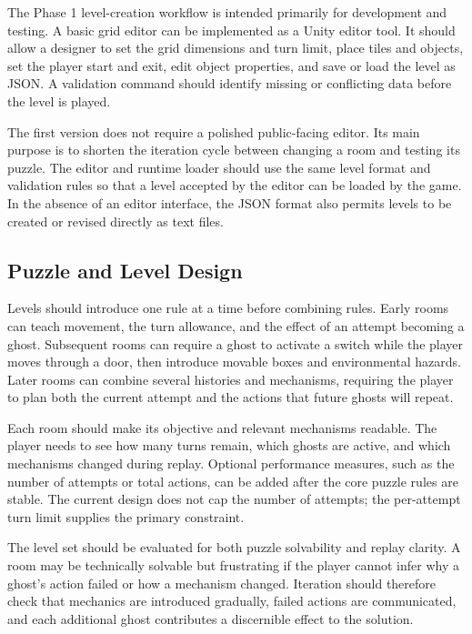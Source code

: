 The Phase 1 level-creation workflow is intended primarily for development and testing. A basic grid editor can be implemented as a Unity editor tool. It should allow a designer to set the grid dimensions and turn limit, place tiles and objects, set the player start and exit, edit object properties, and save or load the level as JSON. A validation command should identify missing or conflicting data before the level is played.

The first version does not require a polished public-facing editor. Its main purpose is to shorten the iteration cycle between changing a room and testing its puzzle. The editor and runtime loader should use the same level format and validation rules so that a level accepted by the editor can be loaded by the game. In the absence of an editor interface, the JSON format also permits levels to be created or revised directly as text files.

\subsection{Puzzle and Level Design}

Levels should introduce one rule at a time before combining rules. Early rooms can teach movement, the turn allowance, and the effect of an attempt becoming a ghost. Subsequent rooms can require a ghost to activate a switch while the player moves through a door, then introduce movable boxes and environmental hazards. Later rooms can combine several histories and mechanisms, requiring the player to plan both the current attempt and the actions that future ghosts will repeat.

Each room should make its objective and relevant mechanisms readable. The player needs to see how many turns remain, which ghosts are active, and which mechanisms changed during replay. Optional performance measures, such as the number of attempts or total actions, can be added after the core puzzle rules are stable. The current design does not cap the number of attempts; the per-attempt turn limit supplies the primary constraint.

The level set should be evaluated for both puzzle solvability and replay clarity. A room may be technically solvable but frustrating if the player cannot infer why a ghost's action failed or how a mechanism changed. Iteration should therefore check that mechanics are introduced gradually, failed actions are communicated, and each additional ghost contributes a discernible effect to the solution.

